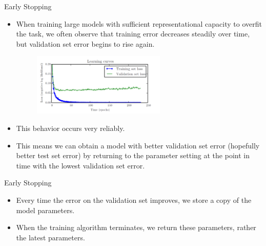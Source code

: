 \documentclass[10pt]{beamer}
\begin{document}
	\begin{frame}{Early Stopping}
		\begin{itemize}
			\item When training large models with sufficient representational capacity to overfit the task, we often observe that training error decreases steadily over time, but validation set error begins to rise again.
			\begin{figure}
				\includegraphics[height=8em]{figures/training-curve-overfit.png}
			\end{figure}
			\pause
			\item This behavior occurs very reliably.
			\pause
			\item This means we can obtain a model with better validation set error (hopefully better test set error) by returning to the parameter setting at the point in time with the lowest validation set error.
		\end{itemize}
	\end{frame}

	\begin{frame}{Early Stopping}
		\begin{itemize}
			\item Every time the error on the validation set improves, we store a copy of the model parameters.
			\pause
			\item When the training algorithm terminates, we return these parameters, rather the latest parameters.
		\end{itemize}
	\end{frame}
\end{document}

